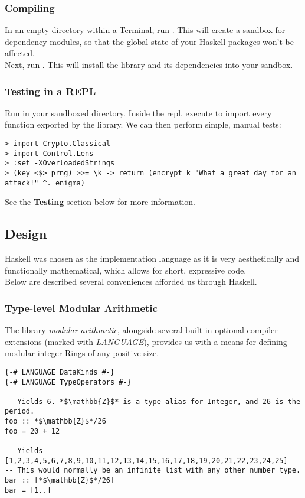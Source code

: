 \documentclass{article}
\begin{document}
\subsubsection{Compiling}
In an empty directory within a Terminal,
run . This will create a
sandbox for dependency modules, so that the global state of your Haskell
packages won't be affected.\\
Next, run . This will install the
library and its dependencies into your sandbox.

\subsubsection{Testing in a REPL}
Run  in your sandboxed directory. Inside the repl,
execute  to import every function
exported by the library. We can then perform simple, manual tests:

\begin{lstlisting}
> import Crypto.Classical
> import Control.Lens
> :set -XOverloadedStrings
> (key <$> prng) >>= \k -> return (encrypt k "What a great day for an attack!" ^. enigma)
\end{lstlisting}

See the \textbf{Testing} section below for more information.

\subsection{Design}
Haskell was chosen as the implementation language as it is very
aesthetically and functionally mathematical,
which allows for short, expressive code.\\
Below are described several conveniences afforded us through Haskell.

\subsubsection{Type-level Modular Arithmetic}
The library \emph{modular-arithmetic}, alongside several built-in
optional compiler extensions (marked with \emph{LANGUAGE}),
provides us with a means for defining
modular integer Rings of any positive size.

\lstset{extendedchars=false,
escapeinside=**}
\begin{lstlisting}
{-# LANGUAGE DataKinds #-}
{-# LANGUAGE TypeOperators #-}

-- Yields 6. *$\mathbb{Z}$* is a type alias for Integer, and 26 is the period.
foo :: *$\mathbb{Z}$*/26
foo = 20 + 12

-- Yields [1,2,3,4,5,6,7,8,9,10,11,12,13,14,15,16,17,18,19,20,21,22,23,24,25]
-- This would normally be an infinite list with any other number type.
bar :: [*$\mathbb{Z}$*/26]
bar = [1..]
\end{lstlisting}
\end{document}
